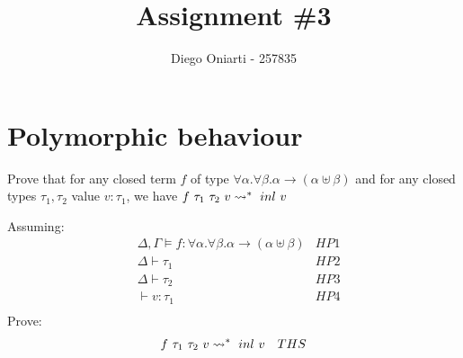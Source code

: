 \documentclass{article}
\title{Assignment \#3}
\author{Diego Oniarti - 257835}
\date{}
\begin{document}
\maketitle

\section{Polymorphic behaviour}
Prove that for any closed term $f$ of type $\forall\alpha.\forall\beta.\alpha\to(\alpha\uplus\beta)$ and for any closed types $\tau_1,\tau_2$ value $v:\tau_1$, we have $f\ \tau_1\ \tau_2\ v\leadsto^{*} \ inl\  v$

Assuming:
\begin{align*}
    & \Delta,\Gamma\vDash f:\forall\alpha.\forall\beta.\alpha\to(\alpha\uplus\beta) & HP1 \\
    & \Delta \vdash \tau_1 & HP2 \\
    & \Delta \vdash \tau_2 & HP3 \\
    & \vdash v:\tau_1       & HP4 \\
\end{align*}
Prove:
\begin{align*}
    & f\ \tau_1\ \tau_2\ v \leadsto^{*} \ inl\  v  & THS
\end{align*}
\end{document}

